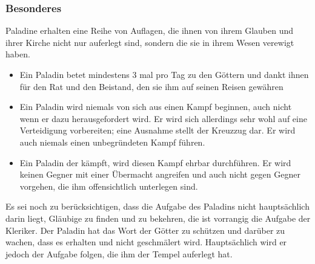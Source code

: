 \subsubsection{Besonderes}
\par Paladine erhalten eine Reihe von Auflagen, die ihnen von ihrem Glauben und ihrer Kirche nicht nur auferlegt 
sind, sondern die sie in ihrem Wesen verewigt haben.
\begin{itemize}
\item Ein Paladin betet mindestens 3 mal pro Tag zu den Göttern und dankt ihnen für den Rat und den Beistand, den 
sie ihm auf seinen Reisen gewähren
\item Ein Paladin wird niemals von sich aus einen Kampf beginnen, auch nicht wenn er dazu herausgefordert wird. Er 
wird sich allerdings sehr wohl auf eine Verteidigung vorbereiten; eine Ausnahme stellt der Kreuzzug dar. Er wird auch 
niemals einen unbegründeten Kampf führen.
\item Ein Paladin der kämpft, wird diesen Kampf ehrbar durchführen. Er wird keinen Gegner mit einer Übermacht 
angreifen und auch nicht gegen Gegner vorgehen, die ihm offensichtlich unterlegen sind.
\end{itemize}
\par Es sei noch zu berücksichtigen, dass die Aufgabe des Paladins nicht hauptsächlich darin liegt, Gläubige zu 
finden und zu bekehren, die ist vorrangig die Aufgabe der Kleriker. Der Paladin hat das Wort der Götter zu schützen 
und darüber zu wachen, dass es erhalten und nicht geschmälert wird. Hauptsächlich wird er jedoch der Aufgabe folgen, 
die ihm der Tempel auferlegt hat.
